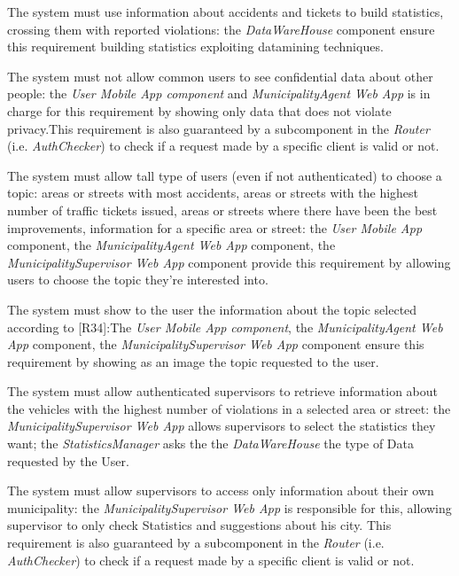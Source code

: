 \documentclass[a4paper]{report}
\begin{document}
\begin{enumerate}[start=1,label={[R\arabic*]}]
\item \label{[R32]}The system must use information  about accidents and tickets to build statistics, crossing them with reported violations: the \textit{DataWareHouse} component ensure this requirement building statistics exploiting datamining techniques.
\item \label{[R33]}The system must not allow common users to see confidential data about other people: the \textit{User Mobile App component} and \textit{MunicipalityAgent Web App} is in charge for this requirement by showing only data that does not violate privacy.This requirement is also guaranteed by a subcomponent in the \textit{Router} (i.e. \textit{AuthChecker}) to check if a request made by a specific client is valid or not.
\item \label{[R34]}The system must allow tall type of users (even if not authenticated) to choose a topic: areas or streets with most accidents, areas or streets with the highest number of traffic tickets issued, areas or streets where there have been the best improvements, information for a specific area or street: the \textit{User Mobile App} component, the  \textit{MunicipalityAgent Web App} component, the \textit{MunicipalitySupervisor Web App} component provide this requirement by allowing users to choose the topic they're interested into.
\item \label{[R35]}The system must show to the user the information about the topic selected according to [R34]:The \textit{User Mobile App component}, the \textit{MunicipalityAgent Web App} component, the \textit{MunicipalitySupervisor Web App} component ensure this requirement by showing as an image the topic requested to the user.
\item \label{[R36]}The system must allow authenticated supervisors to retrieve information about the vehicles with the highest number of violations in a selected area or street: the \textit{MunicipalitySupervisor Web App} allows supervisors to select the statistics they want; the \textit{StatisticsManager} asks the the \textit{DataWareHouse} the type of Data requested by the User.
\item \label{[R37]}The system must allow supervisors to access only information about their own municipality: the \textit{MunicipalitySupervisor Web App} is responsible for this, allowing supervisor to only check Statistics and suggestions about his city. This requirement is also guaranteed by a subcomponent in the \textit{Router} (i.e. \textit{AuthChecker}) to check if a request made by a specific client is valid or not.

\end{enumerate}
\end{document}
